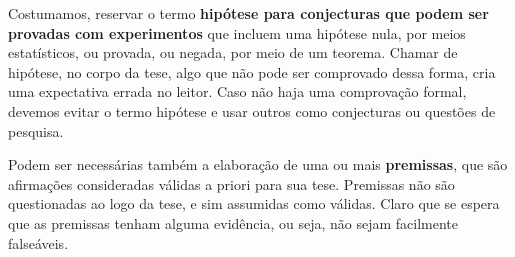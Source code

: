 Costumamos, reservar o termo \textbf{hipótese para conjecturas que podem ser provadas com experimentos} que incluem uma hipótese nula, por meios estatísticos, ou provada, ou negada, por meio de um teorema. Chamar de hipótese, no corpo da tese, algo que não pode ser comprovado dessa forma, cria uma expectativa errada no leitor. Caso não haja uma comprovação formal, devemos evitar o termo hipótese e usar outros como conjecturas ou questões de pesquisa.

Podem ser necessárias também a elaboração de uma ou mais \textbf{premissas}, que são afirmações consideradas válidas a priori para sua tese. Premissas não são questionadas ao logo da tese, e sim assumidas como válidas. Claro que se espera que as premissas tenham alguma evidência, ou seja, não sejam facilmente falseáveis.

